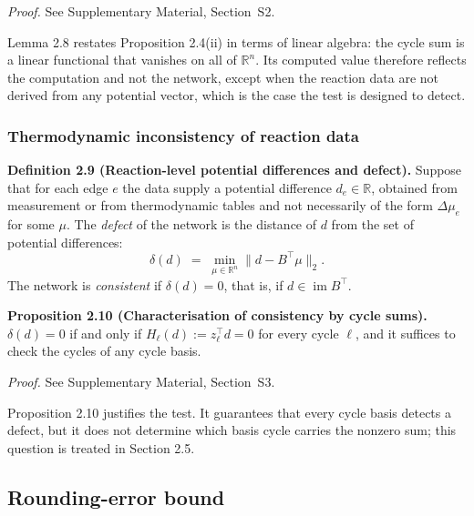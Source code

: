 \documentclass[11pt,a4paper]{article}
\theoremstyle{pstyle}
\theoremstyle{definition}
\theoremstyle{remark}
\newcommand{\R}{\mathbb{R}}
\newcommand{\norm}[1]{\lVert#1\rVert}
\newcommand{\hol}{H}
\begin{document}
\noindent\emph{Proof.} See Supplementary Material, Section~S2.

Lemma 2.8 restates Proposition 2.4(ii) in terms of linear
algebra: the cycle sum is a linear functional that vanishes on all of
$\R^n$. Its computed value therefore reflects the computation and not
the network, except when the reaction data are not derived from any
potential vector, which is the case the test is designed to detect.

\subsubsection{Thermodynamic inconsistency of reaction data}

\par\noindent\textbf{Definition 2.9 (Reaction-level potential differences and defect).}\label{def:defect} 
Suppose that for each edge $e$ the data supply a potential difference
$d_e\in\R$, obtained from measurement or from thermodynamic tables and
not necessarily of the form $\Delta\mu_e$ for some $\mu$. The
\emph{defect} of the network is the distance of $d$ from the set of
potential differences:
\begin{equation}
  \delta(d) \;=\; \min_{\mu\in\R^{n}} \norm{d - B^{\top}\mu}_{2}.
  \label{eq:defect}
\end{equation}
The network is \emph{consistent} if $\delta(d)=0$, that is, if
$d\in\operatorname{im}B^{\top}$.
\par

\par\noindent\textbf{Proposition 2.10 (Characterisation of consistency by cycle sums).}\label{prop:detect-defect} 
$\delta(d)=0$ if and only if $\hol_\ell(d) := z_\ell^{\top}d = 0$ for
every cycle $\ell$, and it suffices to check the cycles of any cycle
basis.
\par

\noindent\emph{Proof.} See Supplementary Material, Section~S3.

Proposition 2.10 justifies the test. It guarantees that every
cycle basis detects a defect, but it does not determine which basis
cycle carries the nonzero sum; this question is treated in
Section 2.5.

\subsection{Rounding-error bound}
\label{sec:numerical-floor}
\end{document}
